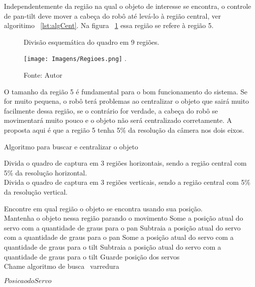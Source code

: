 Independentemente da região na qual o objeto de interesse se encontra, o controle de pan-tilt deve mover a cabeça do robô até levá-lo à região central, ver algoritimo ~\ref{lst:algCent}. Na figura ~\ref{Fig:Regioes} essa região se refere à região 5. 

\begin{figure}[!th]
\centering \caption{Divisão esquemática do quadro em 9 regiões.}
\texttt{[image: Imagens/Regioes.png]}
\DeclareGraphicsExtensions.
\caption*{Fonte: Autor}
\label{Fig:Regioes}
\end{figure}

O tamanho da região 5 é fundamental para o bom funcionamento do sistema. Se for muito pequena, o robô terá problemas ao centralizar o objeto que sairá muito facilmente dessa região, se o contrário for verdade, a cabeça do robô se movimentará muito pouco e o objeto não será centralizado corretamente. A proposta aqui é que a região 5 tenha 5\% da resolução da câmera nos dois eixos. 

\begin{algorithm}

\caption{Algoritmo para buscar e centralizar o objeto}\label{lst:algCent}

Divida o quadro de captura em 3 regiões horizontais, sendo a região central com 5\% da resolução horizontal.\\
Divida o quadro de captura em 3 regiões verticais, sendo a região central com 5\% da resolução vertical.\\
{
		{
		Encontre em qual região o objeto se encontra usando sua posição.\\
					{Mantenha o objeto nessa região parando o movimento}
					{Some a posição atual do servo com a quantidade de graus para o pan}
					{Subtraia a posição atual do servo com a quantidade de graus para o pan}
					{Some a posição atual do servo com a quantidade de graus para o tilt}
					{Subtraia a posição atual do servo com a quantidade de graus para o tilt}
		Guarde posição dos servos\\
		}
		\Senao
		{		
		Chame algoritmo de busca \ varredura
		}
	
}
\Retorna \(Posicao do Servo\)



\end{algorithm}

